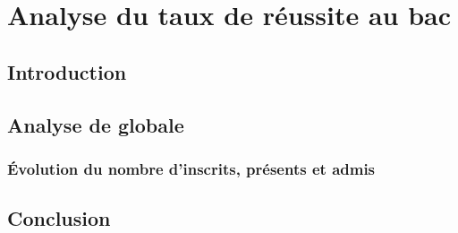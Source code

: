 \chapter{Analyse du taux de réussite au bac}
\section{Introduction}

\section{Analyse de globale} 
\subsection{Évolution du nombre d'inscrits, présents et admis}




\section{Conclusion}